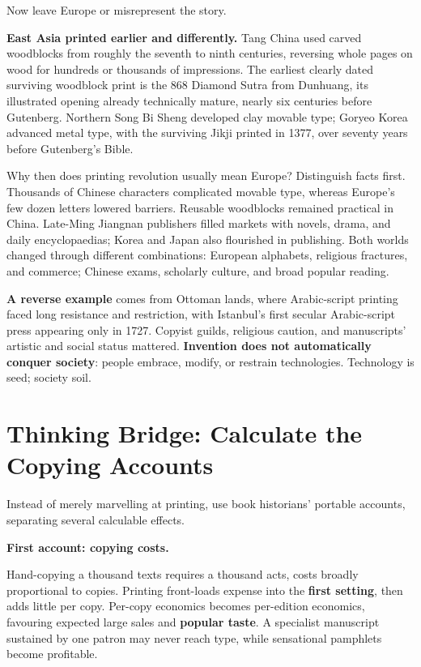 Now leave Europe or misrepresent the story.

\textbf{East Asia printed earlier and differently.} Tang China used carved woodblocks from roughly the seventh to ninth centuries, reversing whole pages on wood for hundreds or thousands of impressions. The earliest clearly dated surviving woodblock print is the 868 Diamond Sutra from Dunhuang, its illustrated opening already technically mature, nearly six centuries before Gutenberg. Northern Song Bi Sheng developed clay movable type; Goryeo Korea advanced metal type, with the surviving Jikji printed in 1377, over seventy years before Gutenberg's Bible.

Why then does printing revolution usually mean Europe? Distinguish facts first. Thousands of Chinese characters complicated movable type, whereas Europe's few dozen letters lowered barriers. Reusable woodblocks remained practical in China. Late-Ming Jiangnan publishers filled markets with novels, drama, and daily encyclopaedias; Korea and Japan also flourished in publishing. Both worlds changed through different combinations: European alphabets, religious fractures, and commerce; Chinese exams, scholarly culture, and broad popular reading.

\textbf{A reverse example} comes from Ottoman lands, where Arabic-script printing faced long resistance and restriction, with Istanbul's first secular Arabic-script press appearing only in 1727. Copyist guilds, religious caution, and manuscripts' artistic and social status mattered. \textbf{Invention does not automatically conquer society}: people embrace, modify, or restrain technologies. Technology is seed; society soil.

\section[Thinking Bridge: The Cost of Copying]{Thinking Bridge: Calculate the Copying Accounts}
Instead of merely marvelling at printing, use book historians' portable accounts, separating several calculable effects.

\textbf{First account: copying costs.}

Hand-copying a thousand texts requires a thousand acts, costs broadly proportional to copies. Printing front-loads expense into the \textbf{first setting}, then adds little per copy. Per-copy economics becomes per-edition economics, favouring expected large sales and \textbf{popular taste}. A specialist manuscript sustained by one patron may never reach type, while sensational pamphlets become profitable.

